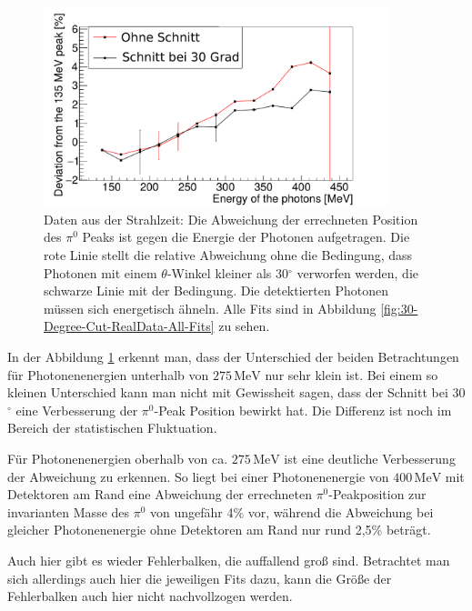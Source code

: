 \documentclass[a4paper,11pt,oneside,final,german,openbib,pdftex]{scrbook}
\begin{document}
{\begin{figure}[h!]
	\begin{center}
		\includegraphics[width=100mm]{20170405StrahlzeitBothDeviation}
		\caption[Strahlzeit: Vernachl\"assigung der Detektoren am Rand; Abweichung]{Daten aus der Strahlzeit: Die Abweichung der errechneten Position des $\pi^0$ Peaks ist gegen die Energie der Photonen aufgetragen. Die rote Linie stellt die relative Abweichung ohne die Bedingung, dass Photonen mit einem $\theta$-Winkel kleiner als 30$^{\circ}$ verworfen werden, die schwarze Linie mit der Bedingung. Die detektierten Photonen m\"ussen sich energetisch \"ahneln. Alle Fits sind in Abbildung \ref{fig:30-Degree-Cut-RealData-All-Fits} zu sehen.}
		\label{fig:Vernachlaessigung-Detektoren-am-Rand}
	\end{center}
\end{figure}

 

In der Abbildung \ref{fig:Vernachlaessigung-Detektoren-am-Rand} erkennt man, dass der Unterschied der beiden Betrachtungen f\"ur Photonenenergien unterhalb von $275\,\text{MeV}$ nur sehr klein ist. Bei einem so kleinen Unterschied kann man nicht mit Gewissheit sagen, dass der Schnitt bei 30$^{\circ}$ eine Verbesserung der $\pi^0$-Peak Position bewirkt hat. Die Differenz ist noch im Bereich der statistischen Fluktuation. 

F\"ur Photonenenergien oberhalb von ca. $ 275\,\text{MeV}$ ist eine deutliche Verbesserung der Abweichung zu erkennen. So liegt bei einer Photonenenergie von $400\,\text{MeV}$ mit Detektoren am Rand eine Abweichung der errechneten $\pi^0$-Peakposition zur invarianten Masse des $\pi^0$ von ungefähr 4\% vor, w\"ahrend die Abweichung bei gleicher Photonenenergie ohne Detektoren am Rand nur rund 2,5\% betr\"agt. 

Auch hier gibt es wieder Fehlerbalken, die auffallend gro{\ss} sind. Betrachtet man sich allerdings auch hier die jeweiligen Fits dazu, kann die Gr\"o{\ss}e der Fehlerbalken auch hier nicht nachvollzogen werden.

}
\end{document}
